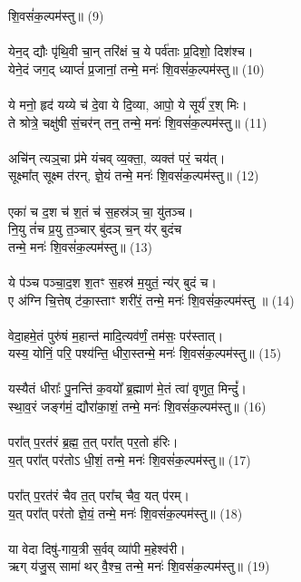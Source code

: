  शि॒वसं॑क॒ल्पम॑स्तु॥ (9)\\
\\
येन॒द् द्यौः पृ॑थि॒वी चा॒न् तरि॑क्षं च॒ ये पर्व॑ताः प्र॒दिशो॒ दिश॑श्च। \\
येने॒दं जग॒द् ध्याप्तं॑ प्र॒जानां॒ तन्मे॒ मनः॑ शि॒वसं॑क॒ल्पम॑स्तु॥ (10)\\
\\
ये मनो॒ हृद॑ यय्ये च॑ दे॒वा ये दि॒व्या, आपो॒ ये सूर्य॑ र॒श् मिः। \\
ते श्रोत्रे॒ चक्षु॑षी सं॒चर॑न् तन्॒ तन्मे॒ मनः॑ शि॒वसं॑क॒ल्पम॑स्तु॥ (11)\\
\\
अचि॑न् त्यञ्॒चा प्र॑मे यंचव् व्य॒क्ता॒, व्यक्त॑ परं॒ चय॑त्। \\
सूक्ष्मा᳚त् सूक्ष्म त॑रन्, ज्ञे॒यं तन्मे॒ मनः॑ शि॒वसं॑क॒ल्पम॑स्तु॥ (12)\\
\\
एका॑ च द॒श च॑ श॒तं च॑ स॒हस्र॑ञ् चा॒ यु॑तञ्च। \\
नि॒यु तं॑च प्र॒यु त॒ञ्चार् बु॑दञ् च॒न् य॑र् बुदंच \\
तन्मे॒ मनः॑ शि॒वसं॑क॒ल्पम॑स्तु॥ (13)\\
\\
ये प॑ञ्च पञ्चा॒द॒श श॒तꣳ स॒हस्र॑ म॒युतं॒ न्य॑र् बुदं च। \\
ए अ॑ग्नि चि॒त्तेष् ट॑का॒स्ताꣳ शरी॑रं॒ तन्मे॒ मनः॑ शि॒वसं॑क॒ल्पम॑स्तु ॥ (14)\\
\\
वेदा॒हमे॒तं पुरु॑षं म॒हान्त॑ मादि॒त्यव॑र्णं॒ तम॑सः॒ पर॑स्तात्। \\
यस्य॒ योनिं॒ परि॒ पश्य॑न्ति॒ धीरा॒स्तन्मे॒ मनः॑ शि॒वसं॑क॒ल्पम॑स्तु॥ (15)\\
\\
यस्यैतं धीराः᳚ पु॒नन्ति॑ क॒वयो᳚ ब्र॒ह्माण॑ मे॒तं त्वा॑ वृणुत॒ मिन्दुं᳚। \\
स्था॒व॒रं जङ्ग॑मं॒ द्यौरा॑का॒शं॒ तन्मे॒ मनः॑ शि॒वसं॑क॒ल्पम॑स्तु॥ (16)\\
\\
परा᳚त् प॒रत॑रं ब्र॒ह्म॒ त॒त् परा᳚त् पर॒तो ह॑रिः। \\
य॒त् परा᳚त् पर॑तोऽ धी॒शं॒ तन्मे॒ मनः॑ शि॒वसं॑क॒ल्पम॑स्तु॥ (17)\\
\\
परा᳚त् प॒रत॑रं चैव त॒त् परा᳚च् चैव॒ यत् प॑रम्। \\
य॒त् परा᳚त् पर॑तो ज्ञे॒यं॒ तन्मे॒ मनः॑ शि॒वसं॑क॒ल्पम॑स्तु॥ (18)\\
\\
या वेदा दिषु॑-गाय॒त्री स॒र्वव् व्या॑पी म॒हेश्व॑री। \\
ऋग् य॑जु॒स् सामा॑ थर् वै॒श्च॒ तन्मे॒ मनः॑ शि॒वसं॑क॒ल्पम॑स्तु॥ (19)\\
